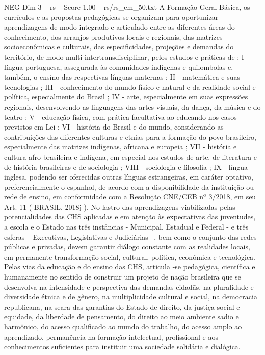 \begin{textsample}{NEG Dim 3 – rs – Score 1.00 – rs/rs\_em\_50.txt}
A Formação Geral Básica, os currículos e as propostas pedagógicas se organizam para oportunizar aprendizagens de modo integrado e articulado entre as diferentes áreas do conhecimento, dos arranjos produtivos locais e regionais, das matrizes socioeconômicas e culturais, das especificidades, projeções e demandas do território, de modo multi-intertransdisciplinar, pelos estudos e práticas de : I - língua portuguesa, assegurada às comunidades indígenas e quilombolas e, também, o ensino das respectivas línguas maternas ; II - matemática e suas tecnologias ; III - conhecimento do mundo físico e natural e da realidade social e política, especialmente do Brasil ; IV - arte, especialmente em suas expressões regionais, desenvolvendo as linguagens das artes visuais, da dança, da música e do teatro ; V - educação física, com prática facultativa ao educando nos casos previstos em Lei ; VI - história do Brasil e do mundo, considerando as contribuições das diferentes culturas e etnias para a formação do povo brasileiro, especialmente das matrizes indígenas, africana e europeia ; VII - história e cultura afro-brasileira e indígena, em especial nos estudos de arte, de literatura e de história brasileiras e de sociologia ; VIII - sociologia e filosofia ; IX - língua inglesa, podendo ser oferecidas outras línguas estrangeiras, em caráter optativo, preferencialmente o espanhol, de acordo com a disponibilidade da instituição ou rede de ensino, em conformidade com a Resolução CNE/CEB nº 3/2018, em seu Art. 11 ( BRASIL, 2018j ).
No lastro das aprendizagens viabilizadas pelas potencialidades das CHS aplicadas e em atenção às expectativas das juventudes, a escola e o Estado nas três instâncias - Municipal, Estadual e Federal - e três esferas – Executivas, Legislativas e Judiciárias –, bem como o conjunto das redes públicas e privadas, devem garantir diálogo constante com as realidades locais, em permanente transformação social, cultural, política, econômica e tecnológica.
Pelas vias da educação e do ensino das CHS, articula -se pedagógica, científica e humanamente no sentido de construir um projeto de nação brasileira que se desenvolva na intensidade e perspectiva das demandas cidadãs, na pluralidade e diversidade étnica e de gênero, na multiplicidade cultural e social, na democracia republicana, na seara das garantias do Estado de direito, da justiça social e equidade, da liberdade de pensamento, do direito ao meio ambiente sadio e harmônico, do acesso qualificado ao mundo do trabalho, do acesso amplo ao aprendizado, permanência na formação intelectual, profissional e aos conhecimentos suficientes para instituir uma sociedade solidária e dialógica.

\end{textsample}
